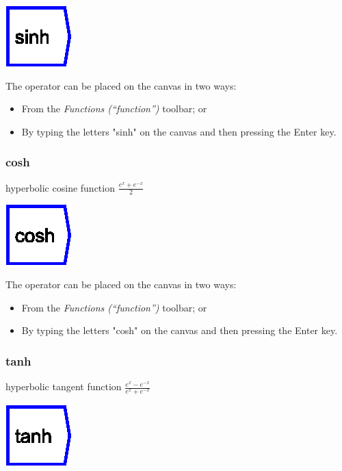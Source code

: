 \includegraphics{images/sinh}

The operator can be placed on the canvas in two ways:
\begin{itemize}
\item From the \emph{Functions (``function'')} toolbar; or 
\item By typing the letters "sinh" on the canvas and then pressing the
Enter key.
\end{itemize}

\subsubsection{cosh}

\label{Operation:cosh} hyperbolic cosine function $\frac{e^{x}+e^{-x}}{2}$ 

\includegraphics{images/cosh}

The operator can be placed on the canvas in two ways:
\begin{itemize}
\item From the \emph{Functions (``function'')} toolbar; or 
\item By typing the letters "cosh" on the canvas and then pressing the
Enter key.
\end{itemize}

\subsubsection{tanh}

\label{Operation:tanh} hyperbolic tangent function $\frac{e^{x}-e^{-x}}{e^{x}+e^{-x}}$ 

\includegraphics{images/tanh}


